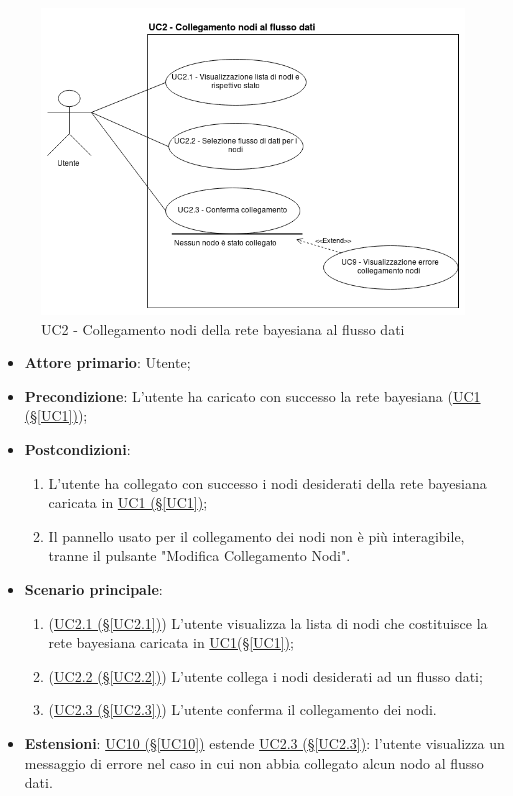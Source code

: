 \begin{figure}[H]
\centering
\includegraphics[scale=0.5]{./images/UC2.png}
\caption{UC2 - Collegamento nodi della rete bayesiana al flusso dati}
\end{figure}

\begin{itemize}
\item \textbf{Attore primario}: Utente;
\item \textbf{Precondizione}: L'utente ha caricato con successo la rete bayesiana (\hyperref[UC1]{UC1 (§\ref*{UC1})});
\item \textbf{Postcondizioni}: 
	\begin{enumerate}
	\item L'utente ha collegato con successo i nodi desiderati della rete bayesiana caricata in \hyperref[UC1]{UC1 				(§\ref*{UC1})};
	\item Il pannello usato per il collegamento dei nodi non è più interagibile, tranne il pulsante "Modifica 							Collegamento Nodi".
	\end{enumerate}
\item \textbf{Scenario principale}:
	\begin{enumerate}
	\item (\hyperref[UC2.1]{UC2.1 (§\ref*{UC2.1})}) L'utente visualizza la lista di nodi che costituisce la rete bayesiana caricata in \hyperref[UC1]{UC1(§\ref*{UC1})};
	\item (\hyperref[UC2.2]{UC2.2 (§\ref*{UC2.2})}) L'utente collega i nodi desiderati ad un flusso dati;
	\item (\hyperref[UC2.3]{UC2.3 (§\ref*{UC2.3})}) L'utente conferma il collegamento dei nodi.
	\end{enumerate}
\item \textbf{Estensioni}: \hyperref[UC10]{UC10 (§\ref*{UC10})} estende \hyperref[UC2.3]{UC2.3 (§\ref*{UC2.3})}: l'utente visualizza un messaggio di errore nel caso in cui non abbia collegato alcun nodo al flusso dati.
\end{itemize}

